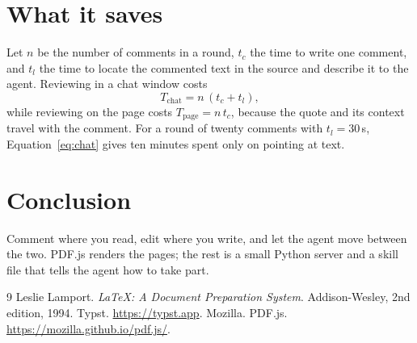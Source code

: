 \documentclass[11pt]{article}
\begin{document}
\section{What it saves}
\label{sec:cost}

Let $n$ be the number of comments in a round, $t_c$ the time to write one comment, and
$t_l$ the time to locate the commented text in the source and describe it to the agent.
Reviewing in a chat window costs
\begin{equation}
T_{\text{chat}} = n\,(t_c + t_l),
\label{eq:chat}
\end{equation}
while reviewing on the page costs $T_{\text{page}} = n\,t_c$, because the quote and its
context travel with the comment. For a round of twenty comments with $t_l = 30$\,s,
Equation~\eqref{eq:chat} gives ten minutes spent only on pointing at text.

\section{Conclusion}

Comment where you read, edit where you write, and let the agent move between the two.
PDF.js \cite{pdfjs} renders the pages; the rest is a small Python server and a
skill file that tells the agent how to take part.

\begin{thebibliography}{9}
 Leslie Lamport. \emph{\LaTeX: A Document Preparation System}.
Addison-Wesley, 2nd edition, 1994.
 Typst. \url{https://typst.app}.
 Mozilla. PDF.js. \url{https://mozilla.github.io/pdf.js/}.
\end{thebibliography}
\end{document}
